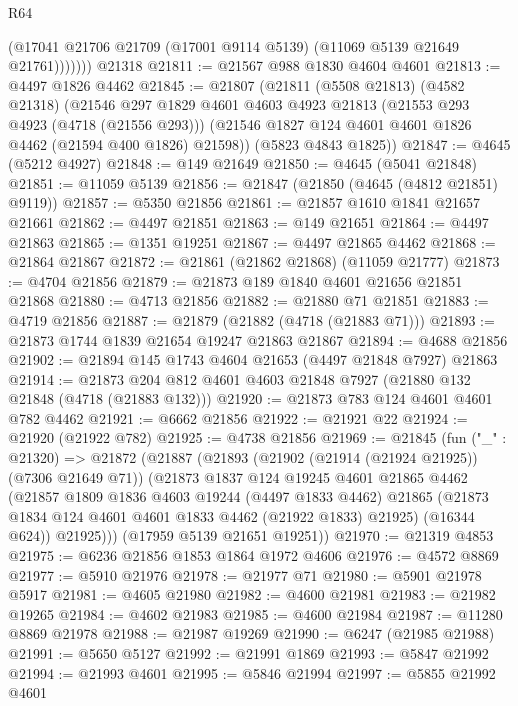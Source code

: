 \begin{lexlean}{R64}
\begin{coremodule}
              (@17041 @21706 @21709 (@17001 @9114 @5139) (@11069 @5139 @21649 @21761)))))))
    @21318
@21811 := @21567 @988 @1830 @4604 @4601
@21813 := @4497 @1826 @4462
@21845 := @21807
    (@21811
      (@5508 @21813)
      (@4582 @21318)
      (@21546
        @297
        @1829
        @4601
        @4603
        @4923
        @21813
        (@21553 @293 @4923 (@4718 (@21556 @293)))
        (@21546 @1827 @124 @4601 @4601 @1826 @4462 (@21594 @400 @1826) @21598))
      (@5823 @4843 @1825))
@21847 := @4645 (@5212 @4927)
@21848 := @149 @21649
@21850 := @4645 (@5041 @21848)
@21851 := @11059 @5139
@21856 := @21847 (@21850 (@4645 (@4812 @21851) @9119))
@21857 := @5350 @21856
@21861 := @21857 @1610 @1841 @21657 @21661
@21862 := @4497 @21851
@21863 := @149 @21651
@21864 := @4497 @21863
@21865 := @1351 @19251
@21867 := @4497 @21865 @4462
@21868 := @21864 @21867
@21872 := @21861 (@21862 @21868) (@11059 @21777)
@21873 := @4704 @21856
@21879 := @21873 @189 @1840 @4601 @21656 @21851 @21868
@21880 := @4713 @21856
@21882 := @21880 @71 @21851
@21883 := @4719 @21856
@21887 := @21879 (@21882 (@4718 (@21883 @71)))
@21893 := @21873 @1744 @1839 @21654 @19247 @21863 @21867
@21894 := @4688 @21856
@21902 := @21894 @145 @1743 @4604 @21653 (@4497 @21848 @7927) @21863
@21914 := @21873 @204 @812 @4601 @4603 @21848 @7927 (@21880 @132 @21848 (@4718 (@21883 @132)))
@21920 := @21873 @783 @124 @4601 @4601 @782 @4462
@21921 := @6662 @21856
@21922 := @21921 @22
@21924 := @21920 (@21922 @782)
@21925 := @4738 @21856
@21969 := @21845
    (fun ("_" : @21320) =>
    @21872
      (@21887
        (@21893
          (@21902 (@21914 (@21924 @21925)) (@7306 @21649 @71))
          (@21873
            @1837
            @124
            @19245
            @4601
            @21865
            @4462
            (@21857
              @1809
              @1836
              @4603
              @19244
              (@4497 @1833 @4462)
              @21865
              (@21873 @1834 @124 @4601 @4601 @1833 @4462 (@21922 @1833) @21925)
              (@16344 @624))
            @21925)))
      (@17959 @5139 @21651 @19251))
@21970 := @21319 @4853
@21975 := @6236 @21856 @1853 @1864 @1972 @4606
@21976 := @4572 @8869
@21977 := @5910 @21976
@21978 := @21977 @71
@21980 := @5901 @21978 @5917
@21981 := @4605 @21980
@21982 := @4600 @21981
@21983 := @21982 @19265
@21984 := @4602 @21983
@21985 := @4600 @21984
@21987 := @11280 @8869 @21978
@21988 := @21987 @19269
@21990 := @6247 (@21985 @21988)
@21991 := @5650 @5127
@21992 := @21991 @1869
@21993 := @5847 @21992
@21994 := @21993 @4601
@21995 := @5846 @21994
@21997 := @5855 @21992 @4601

\end{coremodule}
\end{lexlean}
